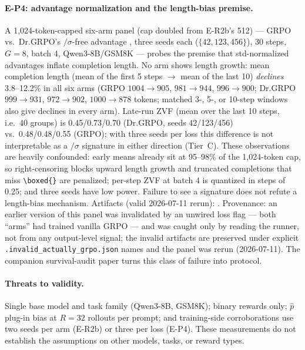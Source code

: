 \documentclass[11pt]{article}
\theoremstyle{plain}
\theoremstyle{definition}
\theoremstyle{remark}
\newcommand{\1}{\mathbb{1}}
\begin{document}
\paragraph{E-P4: advantage normalization and the length-bias premise.}
A 1{,}024-token-capped six-arm panel (cap doubled from E-R2b's 512) --- GRPO
vs.\ Dr.GRPO's $/\sigma$-free advantage \cite{tong2025drgrpo}, three seeds
each ($\{42,123,456\}$), 30 steps, $G{=}8$, batch 4, Qwen3-8B/GSM8K ---
probes the premise that std-normalized advantages inflate completion length.
No arm shows length growth: mean completion length (mean of the first 5 steps
$\to$ mean of the last 10) \emph{declines} 3.8--12.2\% in all six arms (GRPO
$1004{\to}905$, $981{\to}944$, $996{\to}900$; Dr.GRPO $999{\to}931$,
$972{\to}902$, $1000{\to}878$ tokens; matched 3-, 5-, or 10-step windows also
give declines in every arm). Late-run ZVF (mean over the last 10 steps, i.e.\
40 groups) is 0.45/0.73/0.70 (Dr.GRPO, seeds 42/123/456) vs.\ 0.48/0.48/0.55
(GRPO); with three seeds per loss this difference is not interpretable as a
$/\sigma$ signature in either direction (Tier~C). These observations are
heavily confounded: early means already sit at 95--98\% of the 1{,}024-token
cap, so right-censoring blocks upward length growth and truncated completions
that miss \verb|\boxed{}| are penalized; per-step ZVF at batch 4 is quantized
in steps of 0.25; and three seeds have low power. Failure to see a signature
does not refute a length-bias mechanism. Artifacts (valid 2026-07-11 rerun):
.
Provenance: an earlier version of this panel was invalidated by an
unwired loss flag --- both ``arms'' had trained vanilla GRPO --- and was
caught only by reading the runner, not from any output-level signal; the
invalid artifacts are preserved under explicit
\texttt{.invalid\_actually\_grpo.json} names and the panel was rerun
(2026-07-11). The companion survival-audit paper turns this class of
failure into protocol.

\paragraph{Threats to validity.} Single base model and task family
(Qwen3-8B, GSM8K); binary rewards only; $\hat p$ plug-in bias at $R{=}32$
rollouts per prompt; and training-side corroborations use two seeds per
arm (E-R2b) or three per loss (E-P4).
These measurements do not establish the assumptions on other models, tasks, or
reward types.
\end{document}
